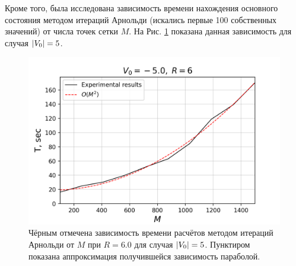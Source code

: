 \documentclass[10pt]{article}
\begin{document}
Кроме того, была исследована зависимость времени нахождения основного состояния методом итераций Арнольди (искались первые 100 собственных значений) от числа точек сетки $M$. На Рис. \ref{fig:T_vs_M_-5.0_l0} показана данная зависимость для случая $\abs{V_0}=5$.
\begin{figure}
 \centering
 \includegraphics[width=\textwidth]{../figures/T_vs_M_-5.0_l5}
 \caption{Чёрным отмечена зависимость времени расчётов методом итераций Арнольди от $M$ при $R=6.0$ для случая $\abs{V_0}=5$. Пунктиром показана аппроксимация получившейся зависимость параболой.}
 \label{fig:T_vs_M_-5.0_l0}
\end{figure}
\end{document}
